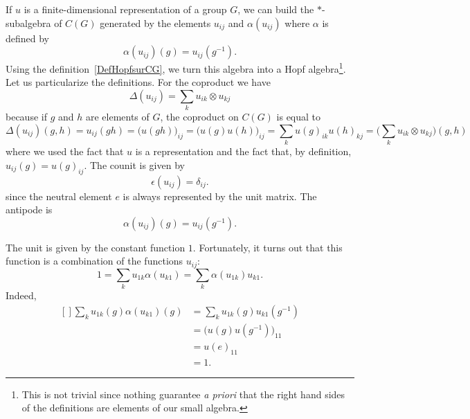 If $u$ is a finite-dimensional representation of a group $G$, we can build the $*$-subalgebra of $C(G)$ generated by the elements $u_{ij}$ and $\alpha(u_{ij})$ where $\alpha$ is defined by
\begin{equation}
	\alpha(u_{ij})(g)=u_{ij}(g^{-1}).
\end{equation}
Using the definition~\ref{DefHopfsurCG}, we turn this algebra into a Hopf algebra\footnote{This is not trivial since nothing guarantee \emph{a priori} that the right hand sides of the definitions are elements of our small algebra.}. Let us particularize the definitions. For the coproduct we have
\begin{equation}
	\Delta(u_{ij})=\sum_k u_{ik}\otimes u_{kj}
\end{equation}
because if $g$ and $h$ are elements of $G$, the coproduct on $C(G)$ is equal to
\begin{equation}
	\Delta(u_{ij})(g,h)=u_{ij}(gh)=\big( u(gh) \big)_{ij}=\big( u(g)u(h) \big)_{ij}=\sum_k u(g)_{ik}u(h)_{kj}=\Big( \sum_k u_{ik}\otimes u_{kj}\Big)(g,h)
\end{equation}
where we used the fact that $u$ is a representation and the fact that, by definition, $u_{ij}(g)=u(g)_{ij}$. The counit is given by
\begin{equation}
	\epsilon(u_{ij})=\delta_{ij}.
\end{equation}
since the neutral element $e$ is always represented by the unit matrix. The antipode is
\begin{equation}
	\alpha(u_{ij})(g)=u_{ij}(g^{-1}).
\end{equation}

The unit is given by the constant function $1$. Fortunately, it turns out that this function is a combination of the functions $u_{ij}$:
\begin{equation}
	1=\sum_k u_{1k}\alpha(u_{k1})=\sum_k\alpha(u_{1k})u_{k1}.
\end{equation}
Indeed,
\begin{equation}
	\begin{aligned}[]
		\sum_ku_{1k}(g)\alpha(u_{k1})(g) & =\sum_ku_{1k}(g)u_{k1}(g^{-1})  \\
		                                 & =\Big( u(g)u(g^{-1}) \Big)_{11} \\
		                                 & =u(e)_{11}                      \\
		                                 & =1.
	\end{aligned}
\end{equation}

